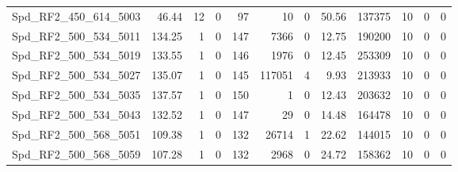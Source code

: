 \begin{longtable}[c]{@{}lrrrrrrrrrrr@{}}
Spd\_RF2\_450\_614\_5003      & 46.44                  & 12                      & 0                       & 97                     & 10                      & 0                       & 50.56                   & 137375                   & 10                       & 0                        & 0                        \\
Spd\_RF2\_500\_534\_5011      & 134.25                 & 1                       & 0                       & 147                    & 7366                    & 0                       & 12.75                   & 190200                   & 10                       & 0                        & 0                        \\
Spd\_RF2\_500\_534\_5019      & 133.55                 & 1                       & 0                       & 146                    & 1976                    & 0                       & 12.45                   & 253309                   & 10                       & 0                        & 0                        \\
Spd\_RF2\_500\_534\_5027      & 135.07                 & 1                       & 0                       & 145                    & 117051                  & 4                       & 9.93                    & 213933                   & 10                       & 0                        & 0                        \\
Spd\_RF2\_500\_534\_5035      & 137.57                 & 1                       & 0                       & 150                    & 1                       & 0                       & 12.43                   & 203632                   & 10                       & 0                        & 0                        \\
Spd\_RF2\_500\_534\_5043      & 132.52                 & 1                       & 0                       & 147                    & 29                      & 0                       & 14.48                   & 164478                   & 10                       & 0                        & 0                        \\
Spd\_RF2\_500\_568\_5051      & 109.38                 & 1                       & 0                       & 132                    & 26714                   & 1                       & 22.62                   & 144015                   & 10                       & 0                        & 0                        \\
Spd\_RF2\_500\_568\_5059      & 107.28                 & 1                       & 0                       & 132                    & 2968                    & 0                       & 24.72                   & 158362                   & 10                       & 0                        & 0                        \\

\end{longtable}

